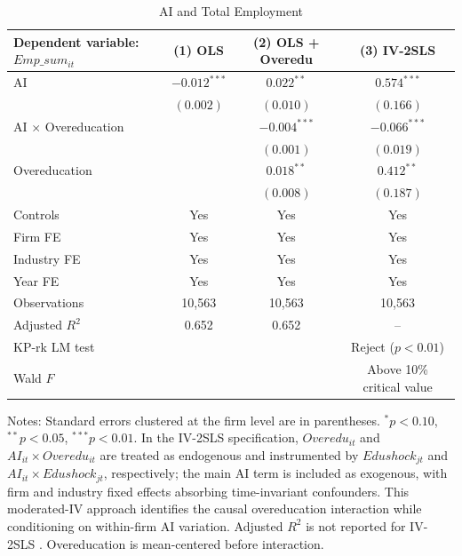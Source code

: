 \documentclass[12pt,a4paper]{article}
\theoremstyle{predstyle}
\theoremstyle{plain}
\newcommand{\Overedu}{\mathit{Overedu}}
\begin{document}
\begin{table}[H]
\centering
\caption{AI and Total Employment}
\label{tab:empbase}
\begin{threeparttable}
\scriptsize
\setlength{\tabcolsep}{4pt}
\begin{tabular}{lccc}
\toprule
Dependent variable: \(Emp\_sum_{it}\) & (1) OLS & (2) OLS + Overedu & (3) IV-2SLS \\
\midrule
AI & \(-0.012^{***}\) & \(0.022^{**}\) & \(0.574^{***}\) \\
 & \((0.002)\) & \((0.010)\) & \((0.166)\) \\
AI \(\times\) Overeducation & & \(-0.004^{***}\) & \(-0.066^{***}\) \\
 & & \((0.001)\) & \((0.019)\) \\
Overeducation & & \(0.018^{**}\) & \(0.412^{**}\) \\
 & & \((0.008)\) & \((0.187)\) \\
Controls & Yes & Yes & Yes \\
Firm FE & Yes & Yes & Yes \\
Industry FE & Yes & Yes & Yes \\
Year FE & Yes & Yes & Yes \\
\midrule
Observations & 10,563 & 10,563 & 10,563 \\
Adjusted \(R^2\) & 0.652 & 0.652 & -- \\
KP-rk LM test & & & Reject (\(p<0.01\)) \\
Wald \(F\) & & & Above 10\% critical value \\
\bottomrule
\end{tabular}
\begin{tablenotes}
\footnotesize
\item Notes: Standard errors clustered at the firm level are in parentheses. \(^{*}p<0.10\), \(^{**}p<0.05\), \(^{***}p<0.01\). In the IV-2SLS specification, \(\Overedu_{it}\) and \(AI_{it} \times \Overedu_{it}\) are treated as endogenous and instrumented by \(Edushock_{jt}\) and \(AI_{it} \times Edushock_{jt}\), respectively; the main AI term is included as exogenous, with firm and industry fixed effects absorbing time-invariant confounders. This moderated-IV approach identifies the causal overeducation interaction while conditioning on within-firm AI variation. Adjusted \(R^2\) is not reported for IV-2SLS \citep{wooldridge2010econometric}. Overeducation is mean-centered before interaction.
\end{tablenotes}
\end{threeparttable}
\end{table}
\end{document}
